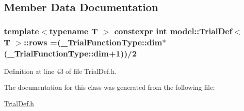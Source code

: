 \subsection{Member Data Documentation}
\hypertarget{classmodel_1_1_trial_def_a4b5daaa9286e1caa2da297c553201fcd}{}
\subsubsection[{rows}]{\setlength{\rightskip}{0pt plus 5cm}template$<$typename T $>$ constexpr int {\bf model\+::\+Trial\+Def}$<$ {\bf T} $>$\+::rows =({\bf \+\_\+\+Trial\+Function\+Type\+::dim}$\ast$({\bf \+\_\+\+Trial\+Function\+Type\+::dim}+1))/2\hspace{0.3cm}{\ttfamily [static]}}\label{classmodel_1_1_trial_def_a4b5daaa9286e1caa2da297c553201fcd}


Definition at line 43 of file Trial\+Def.\+h.



The documentation for this class was generated from the following file\+:\begin{DoxyCompactItemize}
\item 
\hyperlink{_trial_def_8h}{Trial\+Def.\+h}\end{DoxyCompactItemize}
